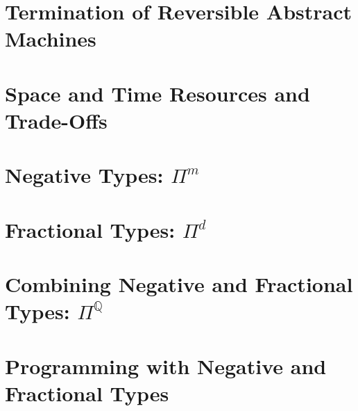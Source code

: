 \documentclass[12pt]{article}
\begin{document}
\section{Termination of Reversible Abstract Machines}

\section{Space and Time Resources and Trade-Offs}

\section{Negative Types: $\Pi^m$}

\section{Fractional Types: $\Pi^d$}

\section{Combining Negative and Fractional Types: $\Pi^{\mathbb{Q}}$}

\section{Programming with Negative and Fractional Types}
\end{document}
